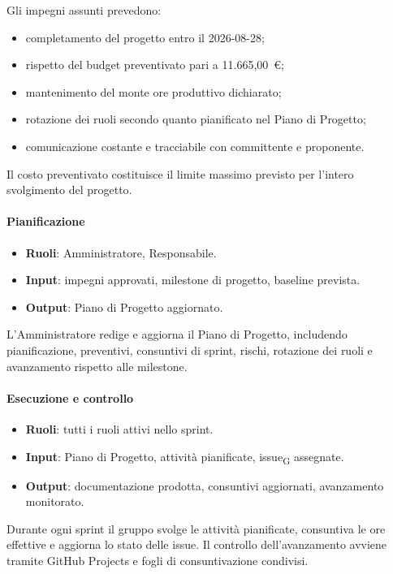 Gli impegni assunti prevedono:
\begin{itemize}
    \item completamento del progetto entro il 2026-08-28;
    \item rispetto del budget preventivato pari a 11.665,00~\euro{};
    \item mantenimento del monte ore produttivo dichiarato;
    \item rotazione dei ruoli secondo quanto pianificato nel Piano di Progetto;
    \item comunicazione costante e tracciabile con committente e proponente.
\end{itemize}

Il costo preventivato costituisce il limite massimo previsto per l'intero
svolgimento del progetto.

\paragraph{Pianificazione}

\begin{itemize}
    \item \textbf{Ruoli}: Amministratore, Responsabile.
    \item \textbf{Input}: impegni approvati, milestone di progetto, baseline prevista.
    \item \textbf{Output}: Piano di Progetto aggiornato.
\end{itemize}

L'Amministratore redige e aggiorna il Piano di Progetto, includendo pianificazione,
preventivi, consuntivi di sprint, rischi, rotazione dei ruoli e avanzamento rispetto
alle milestone.

\paragraph{Esecuzione e controllo}

\begin{itemize}
    \item \textbf{Ruoli}: tutti i ruoli attivi nello sprint.
    \item \textbf{Input}: Piano di Progetto, attività pianificate, issue\textsubscript{G} assegnate.
    \item \textbf{Output}: documentazione prodotta, consuntivi aggiornati, avanzamento
    monitorato.
\end{itemize}

Durante ogni sprint il gruppo svolge le attività pianificate, consuntiva le ore
effettive e aggiorna lo stato delle issue. Il controllo dell'avanzamento avviene
tramite GitHub Projects e fogli di consuntivazione condivisi.

